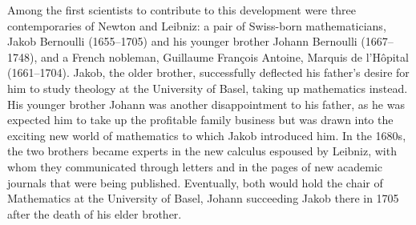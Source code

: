 \message{ !name(LHopitalsRule_2021.03.29.tex)}\documentclass[11pt]{article}
\begin{document}

Among the first scientists to contribute to this development were three contemporaries of Newton and Leibniz: a pair of Swiss-born mathematicians, Jakob Bernoulli (1655--1705) and his younger brother Johann Bernoulli (1667--1748), and a French nobleman, Guillaume Fran\c{c}ois Antoine, Marquis de l'H\^opital (1661--1704). Jakob, the older brother, successfully deflected his father's desire for him to study theology at the University of Basel, taking up mathematics instead. His younger brother Johann was another disappointment to his father, as he was expected him to take up the profitable family business but was drawn into the exciting new world of mathematics to which Jakob introduced him.  In the 1680s, the two brothers became experts in the new calculus espoused by Leibniz, with whom they communicated through letters and in the pages of new academic journals that were being published. Eventually, both would hold the chair of Mathematics at the University of Basel, Johann succeeding Jakob there in 1705 after the death of his elder brother.
\end{document}
